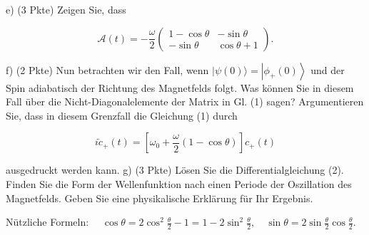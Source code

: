 \documentclass[11pt,a4paper]{article}
\begin{document}
e) (3 Pkte) Zeigen Sie, dass

$$
\mathcal{A}(t)=-\frac{\omega}{2}\left(\begin{array}{cc}
1-\cos \theta & -\sin \theta \\
-\sin \theta & \cos \theta+1
\end{array}\right) .
$$

f) (2 Pkte) Nun betrachten wir den Fall, wenn $|\psi(0)\rangle=\left|\phi_{+}(0)\right\rangle$ und der Spin adiabatisch der Richtung des Magnetfelds folgt. Was können Sie in diesem Fall über die Nicht-Diagonalelemente der Matrix in Gl. (1) sagen? Argumentieren Sie, dass in diesem Grenzfall die Gleichung (1) durch

$$
i \dot{c}_{+}(t)=\left[\omega_0+\frac{\omega}{2}(1-\cos \theta)\right] c_{+}(t)
$$

ausgedruckt werden kann.
g) (3 Pkte) Lösen Sie die Differentialgleichung (2). Finden Sie die Form der Wellenfunktion nach einen Periode der Oszillation des Magnetfelds. Geben Sie eine physikalische Erklärung für Ihr Ergebnis.

Nützliche Formeln: $\quad \cos \theta=2 \cos ^2 \frac{\theta}{2}-1=1-2 \sin ^2 \frac{\theta}{2}, \quad \sin \theta=2 \sin \frac{\theta}{2} \cos \frac{\theta}{2}$.
\end{document}
